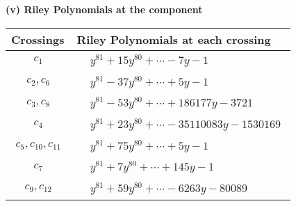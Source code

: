 \documentclass[1p]{elsarticle_modified}
\theoremstyle{definition}
\begin{document}
\newpage\renewcommand{\arraystretch}{1}
\flushleft \textbf{(v) Riley Polynomials at the component}\newline \\
\begin{tabular}{m{50pt}|m{274pt}}
Crossings & \hspace{64pt}Riley Polynomials at each crossing \\
\hline $$\begin{aligned}c_{1}\end{aligned}$$&$\begin{aligned}
&y^{81}+15 y^{80}+\cdots-7 y-1
\end{aligned}$\\
\hline $$\begin{aligned}c_{2},c_{6}\end{aligned}$$&$\begin{aligned}
&y^{81}-37 y^{80}+\cdots+5 y-1
\end{aligned}$\\
\hline $$\begin{aligned}c_{3},c_{8}\end{aligned}$$&$\begin{aligned}
&y^{81}-53 y^{80}+\cdots+186177 y-3721
\end{aligned}$\\
\hline $$\begin{aligned}c_{4}\end{aligned}$$&$\begin{aligned}
&y^{81}+23 y^{80}+\cdots-35110083 y-1530169
\end{aligned}$\\
\hline $$\begin{aligned}c_{5},c_{10},c_{11}\end{aligned}$$&$\begin{aligned}
&y^{81}+75 y^{80}+\cdots+5 y-1
\end{aligned}$\\
\hline $$\begin{aligned}c_{7}\end{aligned}$$&$\begin{aligned}
&y^{81}+7 y^{80}+\cdots+145 y-1
\end{aligned}$\\
\hline $$\begin{aligned}c_{9},c_{12}\end{aligned}$$&$\begin{aligned}
&y^{81}+59 y^{80}+\cdots-6263 y-80089
\end{aligned}$\\
\hline
\end{tabular}\\~\\
\end{document}
